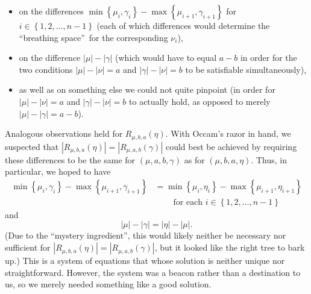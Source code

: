 \documentclass[numbers=enddot,12pt,final,onecolumn,notitlepage]{scrartcl}%
\theoremstyle{definition}
\begin{document}
\begin{itemize}
\item on the differences $\min\left\{  \mu_{i},\gamma_{i}\right\}
-\max\left\{  \mu_{i+1},\gamma_{i+1}\right\}  $ for $i\in\left\{
1,2,\ldots,n-1\right\}  $ (each of which differences would determine the
\textquotedblleft breathing space\textquotedblright\ for the corresponding
$\nu_{i}$),

\item on the difference $\left\vert \mu\right\vert -\left\vert \gamma
\right\vert $ (which would have to equal $a-b$ in order for the two conditions
$\left\vert \mu\right\vert -\left\vert \nu\right\vert =a$ and $\left\vert
\gamma\right\vert -\left\vert \nu\right\vert =b$ to be satisfiable simultaneously),

\item as well as on something else we could not quite pinpoint (in order for
$\left\vert \mu\right\vert -\left\vert \nu\right\vert =a$ and $\left\vert
\gamma\right\vert -\left\vert \nu\right\vert =b$ to actually hold, as opposed
to merely $\left\vert \mu\right\vert -\left\vert \gamma\right\vert =a-b$).
\end{itemize}

\noindent Analogous observations held for $R_{\mu,b,a}\left(  \eta\right)  $.
With Occam's razor in hand, we suspected that $\left\vert R_{\mu,b,a}\left(
\eta\right)  \right\vert =\left\vert R_{\mu,a,b}\left(  \gamma\right)
\right\vert $ could best be achieved by requiring these differences to be the
same for $\left(  \mu,a,b,\gamma\right)  $ as for $\left(  \mu,b,a,\eta
\right)  $. Thus, in particular, we hoped to have%
\begin{align*}
\min\left\{  \mu_{i},\gamma_{i}\right\}  -\max\left\{  \mu_{i+1},\gamma
_{i+1}\right\}   &  =\min\left\{  \mu_{i},\eta_{i}\right\}  -\max\left\{
\mu_{i+1},\eta_{i+1}\right\} \\
&  \ \ \ \ \ \ \ \ \ \ \text{for each }i\in\left\{  1,2,\ldots,n-1\right\}
\end{align*}
and%
\[
\left\vert \mu\right\vert -\left\vert \gamma\right\vert =\left\vert
\eta\right\vert -\left\vert \mu\right\vert .
\]
(Due to the \textquotedblleft mystery ingredient\textquotedblright, this would
likely neither be necessary nor sufficient for $\left\vert R_{\mu,b,a}\left(
\eta\right)  \right\vert =\left\vert R_{\mu,a,b}\left(  \gamma\right)
\right\vert $, but it looked like the right tree to bark up.) This is a system
of equations that whose solution is neither unique nor straightforward.
However, the system was a beacon rather than a destination to us, so we merely
needed something like a good solution.
\end{document}
